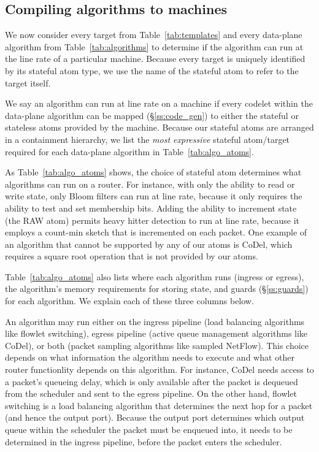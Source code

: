 \subsection{Compiling \pktlanguage algorithms to \absmachine machines}
\label{domino_ss:compiler}
We now consider every target from Table~\ref{tab:templates} and every
data-plane algorithm from Table~\ref{tab:algorithms} to determine if the algorithm
can run at the line rate of a particular \absmachine machine. Because every
target is uniquely identified by its stateful atom type, we use the name of the
stateful atom to refer to the target itself.

We say an algorithm can run at line rate on a \absmachine machine if every
codelet within the data-plane algorithm can be mapped (\S\ref{ss:code_gen}) to
either the stateful or stateless atoms provided by the \absmachine machine.
Because our stateful atoms are arranged in a containment hierarchy, we list the
\textit{most expressive} stateful atom/target required for each data-plane
algorithm in Table~\ref{tab:algo_atoms}.


As Table~\ref{tab:algo_atoms} shows, the choice of stateful atom determines
what algorithms can run on a router. For instance, with only the ability to
read or write state, only Bloom filters can run at line rate, because it only
requires the ability to test and set membership bits.  Adding the ability to
increment state (the RAW atom) permits heavy hitter detection to run at line
rate, because it employs a count-min sketch that is incremented on each packet.
One example of an algorithm that cannot be supported by any of our atoms is
CoDel, which requires a square root operation that is not provided by our
atoms.

Table~\ref{tab:algo_atoms} also lists where each algorithm runs (ingress or
egress), the algorithm's memory requirements for storing state, and guards
(\S\ref{ss:guards}) for each algorithm. We explain each of these three columns
below.

An algorithm may run either on the ingress pipeline (\eg load balancing
algorithms like flowlet switching), egress pipeline (\eg active queue
management algorithms like CoDel), or both (\eg packet sampling algorithms like
sampled NetFlow). This choice depends on what information the algorithm needs
to execute and what other router functionlity depends on this algorithm. For
instance, CoDel needs access to a packet's queueing delay, which is only
available after the packet is dequeued from the scheduler and sent to the
egress pipeline. On the other hand, flowlet switching is a load balancing
algorithm that determines the next hop for a packet (and hence the output
port). Because the output port determines which output queue within the
scheduler the packet must be enqueued into, it needs to be determined in the
ingress pipeline, before the packet enters the scheduler.

